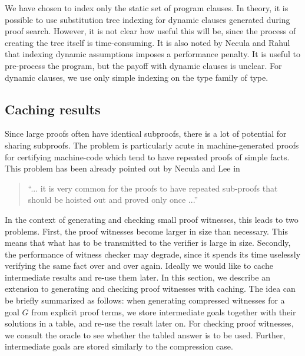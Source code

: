 \documentclass{llncs}
\begin{document}
We have chosen to index only the static set of program clauses. In
theory, it is possible to use substitution tree indexing for dynamic
clauses generated during proof search.  However, it is not clear how
useful this will be, since the process of creating the tree itself is
time-consuming. It is also noted by Necula and
Rahul~\cite{Necula+01:oracle} that indexing dynamic assumptions
imposes a performance penalty. It is useful to pre-process the
program, but the payoff with dynamic clauses is unclear. For dynamic
clauses, we use only simple indexing on the type family of type.



\subsection{Caching results}
\label{sec:tabling}
Since large proofs often have identical subproofs,  there is a
lot of potential for sharing subproofs. The problem is particularly
acute in machine-generated proofs for certifying machine-code which
tend to have repeated proofs of simple facts. This problem has been
already pointed out by Necula and Lee in \cite{NeculaLee+97:resource}

\begin{quote}
``... it is very common for the proofs to have  
repeated sub-proofs that should be hoisted out and 
proved only once ...'' \cite{NeculaLee+97:resource}
 \end{quote}


In the context of generating and checking small proof witnesses, this
leads to two problems.  First, the proof witnesses become larger in
size than necessary. This means that what has to be transmitted to the
verifier is large in size. Secondly, the performance of witness
checker may degrade, since it spends its time uselessly verifying the
same fact over and over again. Ideally we would like to cache
intermediate results and re-use them later. In this section, we
describe an extension to generating and checking proof witnesses with
caching. The idea can be briefly summarized as follows: when
generating compressed witnesses for a goal $G$ from explicit proof
terms, we store intermediate goals together with their solutions in a
table, and re-use the result later on. For checking proof witnesses,
we consult the oracle to see whether the tabled answer is to be
used. Further, intermediate goals are stored similarly to the
compression case.
\end{document}
